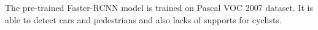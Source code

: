 The pre-trained Faster-RCNN model is trained on Pascal VOC 2007 dataset. It is able to detect cars and pedestrians and also lacks of supports for cyclists.


